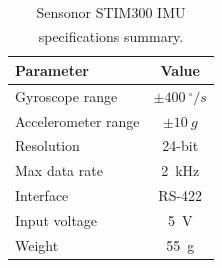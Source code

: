 \begin{table}[H]
    \centering
    \caption{Sensonor STIM300 IMU specifications summary.\textsuperscript{\cite{imu_data_sheet}}}
    \label{tab:IMU-specs}
    \begin{tabular}{lc}
        \hline
        \textbf{Parameter} & \textbf{Value} \\
        \hline
        Gyroscope range & $\pm400~^{\circ}/s$ \\
        Accelerometer range & $\pm10~g$ \\
        Resolution & 24-bit \\
        Max data rate & 2~kHz \\
        Interface & RS-422 \\
        Input voltage & 5~V \\
        Weight & 55~g \\
        \hline
    \end{tabular}
\end{table}



\newpage



